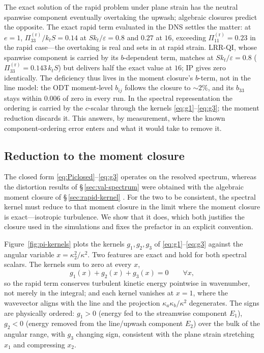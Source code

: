 \documentclass[lineno]{JFM-FLM_Au}
\begin{document}
The exact solution of the rapid problem under plane strain has the neutral
spanwise component eventually overtaking the upwash; algebraic closures
predict the opposite. The exact rapid term evaluated in the DNS settles the
matter: at $e=1$, $\Pi^{(\mathrm r)}_{33}/k_tS = 0.14$ at
$Sk_t/\varepsilon=0.8$ and $0.27$ at $16$, exceeding
$\Pi^{(\mathrm r)}_{11}=0.23$ in the rapid case---the overtaking is real
and sets in at rapid strain. LRR-QI, whose spanwise component is carried by
its $b$-dependent term, matches at $Sk_t/\varepsilon=0.8$
($\Pi^{(\mathrm r)}_{33}=0.143\,k_tS$) but delivers half the exact value at
$16$; IP gives zero identically. The deficiency thus lives in the moment
closure's $b$-term, not in the line model: the ODT moment-level $b_{ij}$
follows the closure to $\sim2\%$, and its $b_{33}$ stays within $0.006$ of
zero in every run. In the spectral representation the ordering is carried
by the $c$-scalar through the kernels
\eqref{eq:g1}--\eqref{eq:g3}; the moment reduction discards it. This
answers, by measurement, where the known component-ordering error enters
and what it would take to remove it.

\subsection{Reduction to the moment closure}\label{sec:lrr-reduction}

The closed form \eqref{eq:Piclosed}--\eqref{eq:g3} operates on the resolved
spectrum, whereas the distortion results of \S\,\ref{sec:val-spectrum} were
obtained with the algebraic moment closure of \S\,\ref{sec:rapid-kernel}
\citep{LaunderReeceRodi1975}. For the two to be consistent, the spectral
kernel must reduce to that moment closure in the limit where the moment
closure is exact---isotropic turbulence. We show that it does, which both
justifies the closure used in the simulations and fixes the prefactor in an
explicit convention.

Figure~\ref{fig:pi-kernels} plots the kernels $g_1,g_2,g_3$ of
\eqref{eq:g1}--\eqref{eq:g3} against the angular variable
$x=\kappa_2^2/\kappa^2$. Two features are exact and hold for both spectral
scalars. The kernels sum to zero at every $x$,
\begin{equation}
  g_1(x)+g_2(x)+g_3(x)=0 \qquad \forall x,
  \label{eq:gtrace}
\end{equation}
so the rapid term conserves turbulent kinetic energy pointwise in wavenumber,
not merely in the integral; and each kernel vanishes at $x=1$, where the
wavevector aligns with the line and the projection $\kappa_a\kappa_b/\kappa^2$
degenerates. The signs are physically ordered: $g_1>0$ (energy fed to the
streamwise component $E_1$), $g_2<0$ (energy removed from the line/upwash
component $E_2$) over the bulk of the angular range, with $g_3$ changing sign,
consistent with the plane strain stretching $x_1$ and compressing $x_2$.
\end{document}
